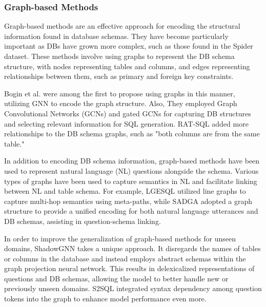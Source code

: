 \subsubsection{Graph-based Methods}

Graph-based methods are an effective approach for encoding the structural information found in database schemas. They have become particularly important as DBs have grown more complex, such as those found in the Spider dataset. These methods involve using graphs to represent the DB schema structure, with nodes representing tables and columns, and edges representing relationships between them, such as primary and foreign key constraints.

Bogin et al.\cite{bogin-etal-2019-representing} were among the first to propose using graphs in this manner, utilizing \ac{GNN} \cite{li2017gated} to encode the graph structure. Also, They employed Graph Convolutional Networks (GCNs) and gated GCNs for capturing DB structures and selecting relevant information for SQL generation. RAT-SQL\cite{wang_rat_sql_2021} added more relationships to the DB schema graphs, such as "both columns are from the same table."

In addition to encoding DB schema information, graph-based methods have been used to represent natural language (NL) questions alongside the schema. Various types of graphs have been used to capture semantics in NL and facilitate linking between NL and table schema. For example, LGESQL\cite{cao-etal-2021-lgesql} utilized line graphs to capture multi-hop semantics using meta-paths, while SADGA\cite{cai_sadga_2022} adopted a graph structure to provide a unified encoding for both natural language utterances and DB schemas, assisting in question-schema linking.

In order to improve the generalization of graph-based methods for unseen domains, ShadowGNN \cite{chen-etal-2021-shadowgnn} takes a unique approach. It disregards the names of tables or columns in the database and instead employs abstract schemas within the graph projection neural network. This results in delexicalized representations of questions and DB schemas, allowing the model to better handle new or previously unseen domains.
S2SQL\cite{hui2022s2sql} integrated syntax dependency among question tokens into the graph to enhance model performance even more.

